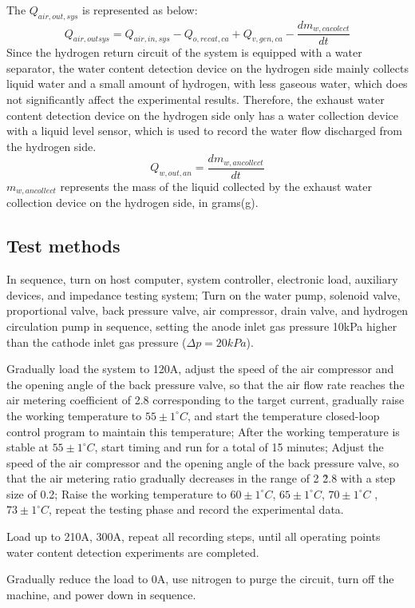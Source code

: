The $Q_{air,out,sys}$ is represented as below:
\begin{equation}
	\label{airFlowOutOfTheSystem}
	Q_{air,outsys}=Q_{air,in,sys}-Q_{o,recat,ca}+Q_{v,gen,ca}-{\frac{dm_{w,cacolect}}{dt}}
\end{equation}
Since the hydrogen return circuit of the system is equipped with a water separator, the water content detection device on the hydrogen side mainly collects liquid water and a small amount of hydrogen, with less gaseous water, which does not significantly affect the experimental results. Therefore, the exhaust water content detection device on the hydrogen side only has a water collection device with a liquid level sensor, which is used to record the water flow discharged from the hydrogen side.
\begin{equation}
	Q_{w,out,an}={\frac{dm_{w,ancollect}}{dt}}
\end{equation}
$m_{w,ancollect}$ represents the mass of the liquid collected by the exhaust water collection device on the hydrogen side, in grams(g).

\subsection*{Test methods}
In sequence, turn on host computer, system controller, electronic load, auxiliary devices, and impedance testing system; Turn on the water pump, solenoid valve, proportional valve, back pressure valve, air compressor, drain valve, and hydrogen circulation pump in sequence, setting the anode inlet gas pressure 10kPa higher than the cathode inlet gas pressure ($\Delta p=20kPa$).
\par
Gradually load the system to 120A, adjust the speed of the air compressor and the opening angle of the back pressure valve, so that the air flow rate reaches the air metering coefficient of 2.8 corresponding to the target current, gradually raise the working temperature to $55\pm1^{\circ}C$, and start the temperature closed-loop control program to maintain this temperature; After the working temperature is stable at $55\pm1^{\circ}C$, start timing and run for a total of 15 minutes; Adjust the speed of the air compressor and the opening angle of the back pressure valve, so that the air metering ratio gradually decreases in the range of 2 \~ 2.8 with a step size of 0.2; Raise the working temperature to $60\pm1^{\circ}C$, $65\pm1^{\circ}C$, $70\pm1^{\circ}C$ , $73\pm1^{\circ}C$, repeat the testing phase and record the experimental data.
\par
Load up to 210A, 300A, repeat all recording steps, until all operating points water content detection experiments are completed.
\par
Gradually reduce the load to 0A, use nitrogen to purge the circuit, turn off the machine, and power down in sequence.
